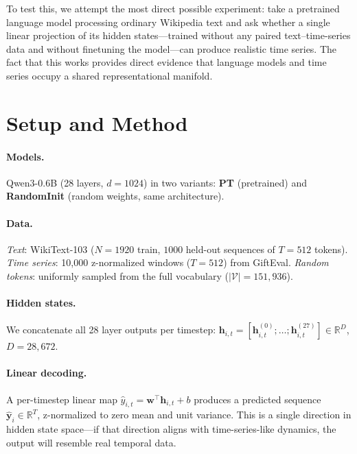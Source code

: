 \documentclass[11pt,a4paper]{article}
\newcommand{\R}{\mathbb{R}}
\begin{document}
To test this, we attempt the most direct possible experiment: take a pretrained language model processing ordinary Wikipedia text and ask whether a single linear projection of its hidden states---trained without any paired text--time-series data and without finetuning the model---can produce realistic time series. The fact that this works provides direct evidence that language models and time series occupy a shared representational manifold.

\section{Setup and Method}

\paragraph{Models.} Qwen3-0.6B (28 layers, $d{=}1024$) in two variants: \textbf{PT} (pretrained) and \textbf{RandomInit} (random weights, same architecture).

\paragraph{Data.} \textit{Text}: WikiText-103 ($N{=}1920$ train, $1000$ held-out sequences of $T{=}512$ tokens). \textit{Time series}: 10{,}000 z-normalized windows ($T{=}512$) from GiftEval. \textit{Random tokens}: uniformly sampled from the full vocabulary ($|\mathcal{V}|{=}151{,}936$).

\paragraph{Hidden states.} We concatenate all 28 layer outputs per timestep:
$\mathbf{h}_{i,t} = [\mathbf{h}_{i,t}^{(0)}; \ldots; \mathbf{h}_{i,t}^{(27)}] \in \R^{D}$, $D = 28{,}672$.

\paragraph{Linear decoding.} A per-timestep linear map $\hat{y}_{i,t} = \mathbf{w}^\top \mathbf{h}_{i,t} + b$ produces a predicted sequence $\hat{\mathbf{y}}_i \in \R^T$, z-normalized to zero mean and unit variance. This is a single direction in hidden state space---if that direction aligns with time-series-like dynamics, the output will resemble real temporal data.
\end{document}
